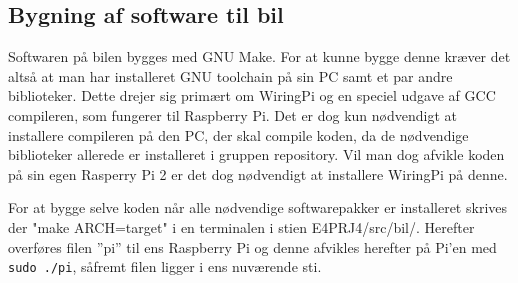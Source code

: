 \subsection{Bygning af software til bil}

Softwaren på bilen bygges med GNU Make\cite{lib:GNU_make}.
For at kunne bygge denne kræver det altså at man har installeret GNU toolchain på sin PC samt et par andre biblioteker.
Dette drejer sig primært om WiringPi\cite{lib:wiringpi} og en speciel udgave af GCC compileren, som fungerer til Raspberry Pi\cite{lib:pi_tools}.
Det er dog kun nødvendigt at installere compileren på den PC, der skal compile koden, da de nødvendige biblioteker allerede er installeret i gruppen repository. 
Vil man dog afvikle koden på sin egen Rasperry Pi 2 er det dog nødvendigt at installere WiringPi på denne.

For at bygge selve koden når alle nødvendige softwarepakker er installeret skrives der "make ARCH=target" i en terminalen i stien E4PRJ4/src/bil/.
Herefter overføres filen ''pi'' til ens Raspberry Pi og denne afvikles herefter på Pi'en med \texttt{sudo ./pi}, såfremt filen ligger i ens nuværende sti.

